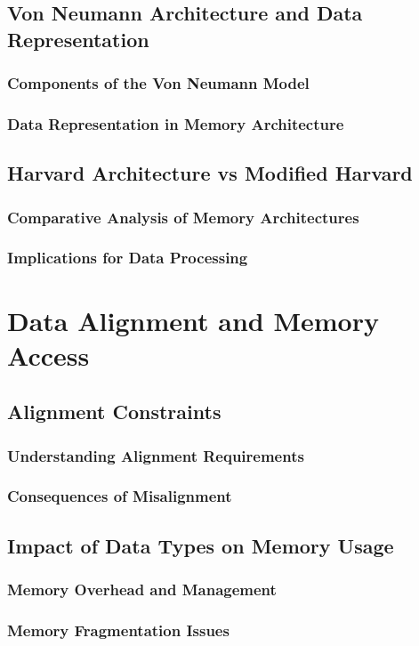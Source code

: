 \documentclass[12pt, oneside]{book}
\begin{document}
\subsection{Von Neumann Architecture and Data Representation}
\subsubsection{Components of the Von Neumann Model}
\subsubsection{Data Representation in Memory Architecture}
\subsection{Harvard Architecture vs Modified Harvard}
\subsubsection{Comparative Analysis of Memory Architectures}
\subsubsection{Implications for Data Processing}
\section{Data Alignment and Memory Access}
\subsection{Alignment Constraints}
\subsubsection{Understanding Alignment Requirements}
\subsubsection{Consequences of Misalignment}
\subsection{Impact of Data Types on Memory Usage}
\subsubsection{Memory Overhead and Management}
\subsubsection{Memory Fragmentation Issues}
\end{document}
